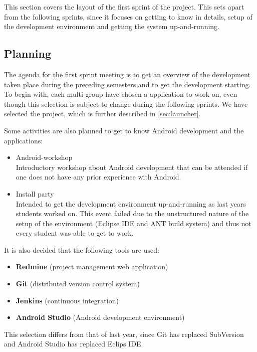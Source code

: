 This section covers the layout of the first sprint of the project.
This sets apart from the following sprints, since it focuses on getting to know \giraf in details, setup of the development environment and getting the system up-and-running.

\subsection{Planning}\label{sec:sprint1:planning}
The agenda for the first sprint meeting is to get an overview of the development taken place during the preceding semesters and to get the development starting.
To begin with, each multi-group have chosen a \giraf application to work on, even though this selection is subject to change during the following sprints.
We have selected the \launcher project, which is further described in \cref{sec:launcher}.

Some activities are also planned to get to know Android development and the \giraf applications:

\begin{itemize}
\item Android-workshop\\
Introductory workshop about Android development that can be attended if one does not have any prior experience with Android.
\item Install party\\
Intended to get the \giraf development environment up-and-running as last years students worked on. This event failed due to the unstructured nature of the setup of the environment (Eclipse IDE and ANT build system) and thus not every student was able to get \giraf to work.
\end{itemize}


It is also decided that the following tools are used:

\begin{itemize}
\item \textbf{Redmine} (project management web application)
\item \textbf{Git} (distributed version control system)
\item \textbf{Jenkins} (continuous integration)
\item \textbf{Android Studio} (Android development environment)
\end{itemize}

This selection differs from that of last year, since Git has replaced SubVersion and Android Studio has replaced Eclips IDE.


